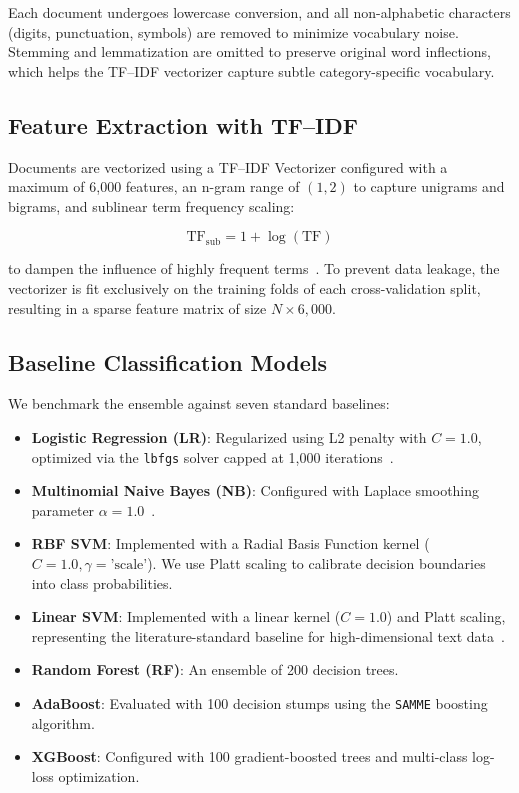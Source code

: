 \documentclass[conference]{IEEEtran}
\begin{document}
Each document undergoes lowercase conversion, and all non-alphabetic characters (digits, punctuation, symbols) are removed to minimize vocabulary noise. Stemming and lemmatization are omitted to preserve original word inflections, which helps the TF--IDF vectorizer capture subtle category-specific vocabulary.

\subsection{Feature Extraction with TF--IDF}

Documents are vectorized using a TF--IDF Vectorizer configured with a maximum of 6,000 features, an n-gram range of $(1, 2)$ to capture unigrams and bigrams, and sublinear term frequency scaling:

\begin{equation}
  \text{TF}_{\text{sub}} = 1 + \log(\text{TF})
\end{equation}

\noindent to dampen the influence of highly frequent terms~\cite{ref7}. To prevent data leakage, the vectorizer is fit exclusively on the training folds of each cross-validation split, resulting in a sparse feature matrix of size $N \times 6{,}000$.

\subsection{Baseline Classification Models}

We benchmark the ensemble against seven standard baselines:
\begin{itemize}
  \item \textbf{Logistic Regression (LR)}: Regularized using L2 penalty with $C = 1.0$, optimized via the \texttt{lbfgs} solver capped at 1,000 iterations~\cite{ref3}.
  \item \textbf{Multinomial Naive Bayes (NB)}: Configured with Laplace smoothing parameter $\alpha = 1.0$~\cite{ref10}.
  \item \textbf{RBF SVM}: Implemented with a Radial Basis Function kernel ($C = 1.0, \gamma = \text{'scale'}$). We use Platt scaling to calibrate decision boundaries into class probabilities.
  \item \textbf{Linear SVM}: Implemented with a linear kernel ($C = 1.0$) and Platt scaling, representing the literature-standard baseline for high-dimensional text data~\cite{ref1}.
  \item \textbf{Random Forest (RF)}: An ensemble of 200 decision trees.
  \item \textbf{AdaBoost}: Evaluated with 100 decision stumps using the \texttt{SAMME} boosting algorithm.
  \item \textbf{XGBoost}: Configured with 100 gradient-boosted trees and multi-class log-loss optimization.
\end{itemize}
\end{document}
